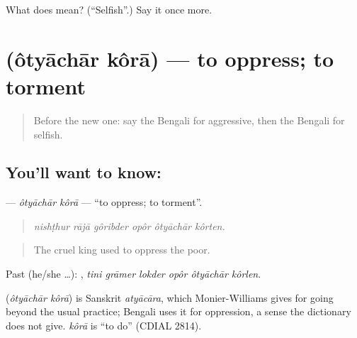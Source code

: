 \begin{tcolorbox}[breakable,colback=teal!4,colframe=teal!35!black,title={Before you move on}]
What does  mean? (\textquotedblleft{}Selfish\textquotedblright{}.) Say it once more.
\end{tcolorbox}
\section[\texorpdfstring{\bn{অত্যাচার} \bn{করা} (ôtyāchār kôrā)}{অত্যাচার করা (ôtyāchār kôrā)}]{  (ôtyāchār kôrā) — to oppress; to torment}

\label{lesson:BN-C460-otyachar-kora}



\begin{quote}
Before the new one: say the Bengali for aggressive, then the Bengali for selfish.
\end{quote}

\subsection*{You'll want to know:  }
\textbf{ } — \emph{ôtyāchār kôrā} — \textquotedblleft{}to oppress; to torment\textquotedblright{}.

\begin{quote}
     
\end{quote}

\begin{quote}
\emph{nishṭhur rājā gôribder opôr ôtyāchār kôrten.}
\end{quote}

\begin{quote}
The cruel king used to oppress the poor.
\end{quote}

Past (he/she …):      , \emph{tini grāmer lokder opôr ôtyāchār kôrlen}.

\begin{cousinweb}
\textbf{ } (\emph{ôtyāchār kôrā}) is Sanskrit \emph{atyācāra}, which Monier-Williams gives for going beyond the usual practice; Bengali uses it for oppression, a sense the dictionary does not give. \emph{kôrā} is \textquotedblleft{}to do\textquotedblright{} (CDIAL 2814).
\end{cousinweb}

